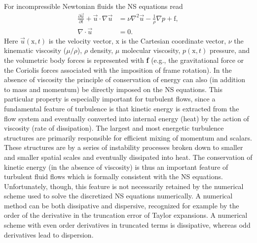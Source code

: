 For incompressible Newtonian fluids the NS equations read
\begin{align}
 \frac{\partial \vec{u}}{\partial t}+\vec{u}\cdot \nabla \vec{u} &= \nu \nabla^2 \vec{u} -\frac{1}{\rho} \nabla p +\text{f}, \label{eq:NS}\\
 \nabla \cdot \vec{u} &=0.
 \label{eq:cont}
\end{align}
Here $\vec{u}(\text{x},t)$ is the velocity vector, $\text{x}$ is the
Cartesian coordinate vector, $\nu$ the kinematic viscosity
($\mu/\rho$), $\rho$ density, $\mu$ molecular viscosity,
$p(\text{x},t)$ pressure, and the volumetric body forces is
represented with \textbf{f} (e.g., the gravitational force or the
Coriolis forces associated with the imposition of frame rotation). In
the absence of viscosity the principle of conservation of energy can
also (in addition to mass and momentum) be directly imposed on the NS
equations. This particular property is especially important for
turbulent flows, since a fundamental feature of turbulence is that
kinetic energy is extracted from the flow system and eventually
converted into internal energy (heat) by the action of viscosity (rate
of dissipation). The largest and most energetic turbulence structures
are primarily responsible for efficient mixing of momentum and
scalars. These structures are by a series of instability processes
broken down to smaller and smaller spatial scales and eventually
dissipated into heat. The conservation of kinetic energy (in the
absence of viscosity) is thus an important feature of turbulent fluid
flows which is formally consistent with the NS
equations. Unfortunately, though, this feature is not necessarily
retained by the numerical scheme used to solve the discretized NS
equations numerically. A numerical method can be both dissipative and
dispersive, recognized for example by the order of the derivative in
the truncation error of Taylor expansions. A numerical scheme with
even order derivatives in truncated terms is dissipative, whereas odd
derivatives lead to dispersion.

